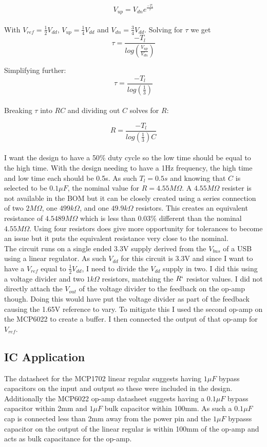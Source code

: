 \[
V_{up} = V_{dn}e^{\frac{-T_l}{\tau}}
\]\\

With $V_{ref} = \frac{1}{2}V_{dd}$, $V_{up} = \frac{1}{4}V_{dd}$ and $V_{dn} =  \frac{3}{4}V_{dd}$. 
Solving for $\tau$ we get
\[
\tau = \frac{-T_l}{log \left( \frac{V_{up}}{V_{dn}} \right)}
\]

Simplifying further:
\[
\tau = \frac{-T_l}{log \left( \frac{1}{3} \right)}
\]\\

Breaking $\tau$ into $RC$ and dividing out $C$ solves for $R$:

\[
R = \frac{-T_l}{log\left( \frac{1}{3} \right)C}
\]\\


I want the design to have a 50\% duty cycle so the low time should be equal
to the high time. With the design needing to have a 1Hz frequency, the high
time and low time each should be 0.5s. As such $T_l = 0.5s$ and knowing that
$C$ is selected to be $0.1\mu F$, the nominal value for $R = 4.55M \Omega$. A 
$4.55M\Omega$ resister is not available in the BOM but it can be closely created
using a series connection of two $2M\Omega$, one $499k\Omega$, and one $49.9k\Omega$ resistors.
This creates an equivalent resistance of $4.5489M\Omega$ which is less than 0.03\% different 
than the nominal $4.55M\Omega$. Using four resistors does give more opportunity for
tolerances to become an issue but it puts the equivalent resistance very close to
the nominal.\\

The circuit runs on a single ended 3.3V supply derived from the $V_{bus}$ of a USB using a linear regulator.
As such $V_{dd}$ for this circuit is 3.3V and since I want to have a $V_{ref}$ equal to $\frac{1}{2}V_{dd}$,
I need to divide the $V_{dd}$ supply in two. I did this using a voltage divider and two $1k\Omega$ resistors,
matching the $R`$ resistor values.
I did not directly attach the $V_{out}$ of the voltage divider to the feedback on the op-amp though. 
Doing this would have put the voltage divider as part of the feedback causing the 1.65V reference
to vary. To mitigate this I used the second op-amp on the MCP6022 to create a buffer. I then connected
the output of that op-amp for $V_{ref}$. 

\subsection*{IC Application}
The datasheet for the MCP1702 linear regular suggests having $1\mu F$ bypass capacitors on the 
input and output so these were included in the design. Additionally the MCP6022 op-amp datasheet suggests
having a $0.1\mu F$ bypass capacitor within 2mm and $1\mu F$ bulk capacitor within 100mm.
As such a $0.1\mu F$ cap is connected less than 2mm away from the power pin and the $1\mu F$ bypasss
capacitor on the output of the linear regular is within 100mm of the op-amp and acts as bulk capacitance
for the op-amp.


